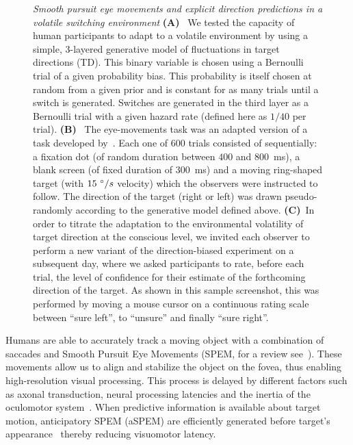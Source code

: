 \documentclass[12pt,english]{article}%
\newcommand{\ms}{\si{\milli\second}}%
\newcommand{\citep}[1]{\parencite{#1}}
\newcommand{\citet}[1]{\textcite{#1}}
\begin{document}
\begin{figure}
{\begin{tikzpicture}
\end{tikzpicture}
}
\caption{
\emph{Smooth pursuit eye movements and explicit direction predictions in a volatile switching environment}
\textbf{(A)}~
We tested the capacity of human participants to adapt to a volatile environment 
by using a simple, 3-layered generative model of fluctuations in target directions (TD).
This binary variable is chosen using a Bernoulli trial of a given probability bias.
This probability is itself chosen at random from a given prior 
and is constant for as many trials until a switch is generated.
Switches are generated in the third layer as a Bernoulli trial 
with a given hazard rate (defined here as $1/40$ per trial).
\textbf{(B)}~
The eye-movements task was an adapted version of a task developed by~\citet{Montagnini2010}. 
Each one of $600$ trials consisted of sequentially:
a fixation dot (of random duration between $400$ and $800$~\ms),
a blank screen (of fixed duration of  $300$~\ms) and
a moving ring-shaped target (with $15~\degree/s$ velocity) which the observers were instructed to follow.
The direction of the target (right or left) was drawn pseudo-randomly
according to the generative model defined above. 
\textbf{(C)}~In order to titrate the adaptation 
to the environmental volatility of target direction at the conscious level,
we invited each observer to perform a new variant of the direction-biased experiment on a subsequent day,
where we asked participants to rate, before each trial, the level of confidence
for their estimate of the forthcoming direction of the target.
As shown in this sample screenshot,
this was performed by moving a mouse cursor on a continuous rating scale
between ``sure left'', to ``unsure'' and finally ``sure right''.
}
\label{fig:intro}
\end{figure}
Humans are able to accurately track a moving object
with a combination of saccades and
Smooth Pursuit Eye Movements (SPEM, for a review see~\citet{Krauzlis2008}).
These movements allow us to align and
stabilize the object on the fovea,
thus enabling high-resolution visual processing.
This process is delayed by different factors such as axonal transduction,
neural processing latencies and the inertia of the oculomotor system~\citep{Krauzlis89}.
When predictive information is available about target motion,
anticipatory SPEM (aSPEM) are
efficiently generated before target's appearance~\citep{Westheimer1954, Kowler1979a, Kowler1979b} thereby reducing visuomotor latency.
\end{document}
